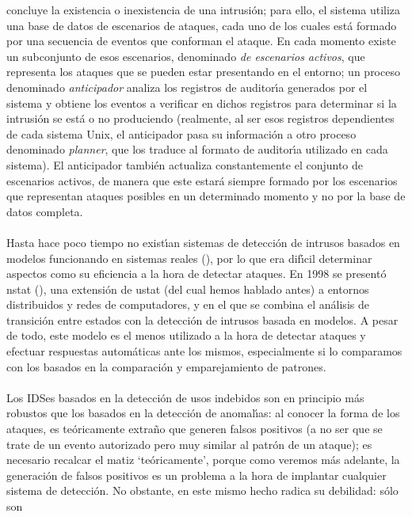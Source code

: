 concluye la existencia o inexistencia de una intrusi\'on; para ello, el sistema
utiliza una base de datos de escenarios de ataques, cada uno de los cuales 
est\'a formado por una secuencia de eventos que conforman el ataque. En cada
momento existe un subconjunto de esos escenarios, denominado {\it de escenarios
activos}, que representa los ataques que se pueden estar presentando en el 
entorno; un proceso denominado {\it anticipador} analiza los registros de
auditor\'{\i}a generados por el sistema y obtiene los eventos a verificar en
dichos registros para determinar si la intrusi\'on se est\'a o no produciendo
(realmente, al ser esos registros dependientes de cada sistema Unix, el 
anticipador pasa su informaci\'on a otro proceso denominado {\it planner}, que
los traduce al formato de auditor\'{\i}a utilizado en cada sistema). El 
anticipador tambi\'en actualiza constantemente el conjunto de es\-ce\-na\-rios 
activos, de manera que este estar\'a siempre formado por los 
escenarios que representan ataques posibles en un determinado momento y no por 
la base de datos completa.\\
\\Hasta hace poco tiempo no exist\'{\i}an sistemas de detecci\'on de intrusos 
basados en modelos funcionando en sistemas reales (\cite{kn:ku95}), por lo que 
era dif\'{\i}cil determinar aspectos como su eficiencia a la hora de detectar 
ataques. En 1998 se present\'o {\sc nstat} (\cite{kn:ke98}), una extensi\'on de
{\sc ustat} (del cual hemos hablado antes) a entornos distribuidos y redes de
computadores, y en el que se combina el an\'alisis de transici\'on entre 
estados con la detecci\'on de intrusos basada en modelos. A pesar de todo, este
modelo es el menos utilizado a la hora de detectar ataques y efectuar respuestas
autom\'aticas ante los mismos, especialmente si lo comparamos con los basados en
la comparaci\'on y emparejamiento de patrones.\\
\\Los IDSes basados en la detecci\'on de usos indebidos son en principio m\'as
robustos que los basados en la detecci\'on de anomal\'{\i}as: al conocer la
forma de los ataques, es te\'oricamente extra\~no que generen falsos positivos 
(a no ser que se trate de un evento autorizado pero muy similar al patr\'on de 
un ataque); es necesario recalcar el matiz `te\'oricamente', porque como 
veremos m\'as adelante, la generaci\'on de falsos positivos es un problema a la
hora de implantar cualquier sistema de detecci\'on. No obstante, en este mismo 
hecho radica su debilidad: s\'olo son 
